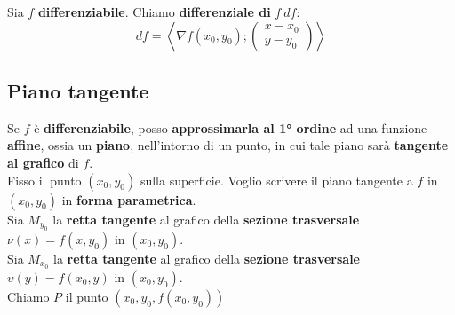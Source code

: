 \documentclass[a4paper, oneside]{article}
\begin{document}
    \begin{definition}
        Sia $f$ \textbf{differenziabile}. Chiamo \textbf{differenziale di} $f \ df$:
        \[df = \left\langle \nabla f(x_0,y_0);\begin{pmatrix}
            x-x_0 \\ y-y_0
        \end{pmatrix}\right\rangle \]
    \end{definition}

    \subsection{Piano tangente}
    Se $f$ è \textbf{differenziabile}, posso \textbf{approssimarla al 1° ordine} ad una funzione \textbf{affine}, ossia un \textbf{piano}, 
    nell'intorno di un punto, in cui tale piano sarà \textbf{tangente al grafico} di $f$.\\
    Fisso il punto $(x_0,y_0)$ sulla superficie. Voglio scrivere il piano tangente a $f$ in $(x_0,y_0)$ in \textbf{forma parametrica}.\\
    Sia $M_{y_0}$ la \textbf{retta tangente} al grafico della \textbf{sezione trasversale} $\nu(x) = f(x,y_0)$ in $(x_0,y_0)$.\\
    Sia $M_{x_0}$ la \textbf{retta tangente} al grafico della \textbf{sezione trasversale} $\upsilon(y) = f(x_0,y)$ in $(x_0,y_0)$.\\

    \noindent Chiamo $P$ il punto $\left(x_0,y_0,f(x_0,y_0)\right)$
\end{document}
